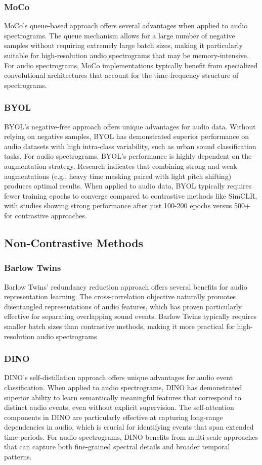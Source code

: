 \documentclass[11pt]{article}
\begin{document}
\subsubsection{MoCo}
MoCo's queue-based approach offers several advantages when applied to audio spectrograms. The queue mechanism allows for a large number of negative samples without requiring extremely large batch sizes, making it particularly suitable for high-resolution audio spectrograms that may be memory-intensive. For audio spectrograms, MoCo implementations typically benefit from specialized convolutional architectures that account for the time-frequency structure of spectrograms.
\subsubsection{BYOL}
BYOL's negative-free approach offers unique advantages for audio data. Without relying on negative samples, BYOL has demonstrated superior performance on audio datasets with high intra-class variability, such as urban sound classification tasks. For audio spectrograms, BYOL's performance is highly dependent on the augmentation strategy. Research indicates that combining strong and weak augmentations (e.g., heavy time masking paired with light pitch shifting) produces optimal results. When applied to audio data, BYOL typically requires fewer training epochs to converge compared to contrastive methods like SimCLR, with studies showing strong performance after just 100-200 epochs versus 500+ for contrastive approaches.
\subsection{Non-Contrastive Methods}
\subsubsection{Barlow Twins}
Barlow Twins' redundancy reduction approach offers several benefits for audio representation learning. The cross-correlation objective naturally promotes disentangled representations of audio features, which has proven particularly effective for separating overlapping sound events. Barlow Twins typically requires smaller batch sizes than contrastive methods, making it more practical for high-resolution audio spectrograms
\subsubsection{DINO}
DINO's self-distillation approach offers unique advantages for audio event classification. When applied to audio spectrograms, DINO has demonstrated superior ability to learn semantically meaningful features that correspond to distinct audio events, even without explicit supervision. The self-attention components in DINO are particularly effective at capturing long-range dependencies in audio, which is crucial for identifying events that span extended time periods. For audio spectrograms, DINO benefits from multi-scale approaches that can capture both fine-grained spectral details and broader temporal patterns.
\end{document}
